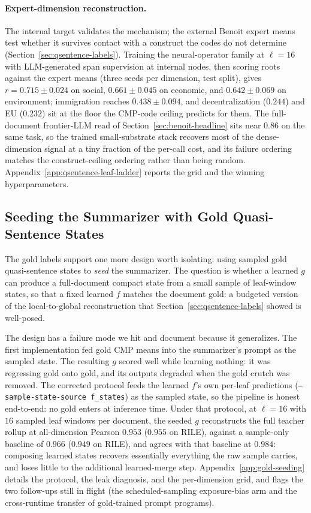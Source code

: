 \paragraph{Expert-dimension reconstruction.} The internal target
validates the mechanism; the external Benoit expert means test whether
it survives contact with a construct the codes do not determine
(Section~\ref{sec:qsentence-labels}). Training the neural-operator
family at $\ell = 16$ with LLM-generated span supervision at internal
nodes, then scoring roots against the expert means (three seeds per
dimension, test split), gives $r = 0.715 \pm 0.024$ on social,
$0.661 \pm 0.045$ on economic, and $0.642 \pm 0.069$ on environment;
immigration reaches $0.438 \pm 0.094$, and decentralization ($0.244$)
and EU ($0.232$) sit at the floor the CMP-code ceiling predicts for
them. The full-document frontier-LLM read of
Section~\ref{sec:benoit-headline} sits near $0.86$ on the same task, so
the trained small-substrate stack recovers most of the dense-dimension
signal at a tiny fraction of the per-call cost, and its failure
ordering matches the construct-ceiling ordering rather than being
random. Appendix~\ref{app:qsentence-leaf-ladder} reports the grid and
the winning hyperparameters.

\subsection{Seeding the Summarizer with Gold Quasi-Sentence States}\label{sec:gold-seeding}

The gold labels support one more design worth isolating: using sampled
gold quasi-sentence states to \emph{seed} the summarizer. The question
is whether a learned $g$ can produce a full-document compact state from
a small sample of leaf-window states, so that a fixed learned $f$
matches the document gold: a budgeted version of the local-to-global
reconstruction that Section~\ref{sec:qsentence-labels} showed is
well-posed.

The design has a failure mode we hit and document because it
generalizes. The first implementation fed gold CMP means into the
summarizer's prompt as the sampled state. The resulting $g$ scored
well while learning nothing: it was regressing gold onto gold, and its
outputs degraded when the gold crutch was removed. The corrected
protocol feeds the learned $f$'s own per-leaf predictions
(\texttt{--sample-state-source f\_states}) as the sampled state, so
the pipeline is honest end-to-end: no gold enters at inference time.
Under that protocol, at $\ell = 16$ with $16$ sampled leaf windows per
document, the seeded $g$ reconstructs the full teacher rollup at
all-dimension Pearson $0.953$ ($0.955$ on RILE), against a
sample-only baseline of $0.966$ ($0.949$ on RILE), and agrees with
that baseline at $0.984$: composing learned states recovers
essentially everything the raw sample carries, and loses little to
the additional learned-merge step. Appendix~\ref{app:gold-seeding}
details the protocol, the leak diagnosis, and the per-dimension grid,
and flags the two follow-ups still in flight (the scheduled-sampling
exposure-bias arm and the cross-runtime transfer of gold-trained
prompt programs).

